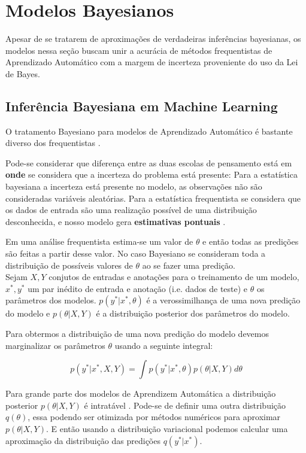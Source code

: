 \section{Modelos Bayesianos}

Apesar de se tratarem de aproximações de verdadeiras inferências bayesianas, os
modelos nessa seção buscam unir a acurácia de métodos frequentistas de
Aprendizado Automático com a
margem de incerteza proveniente do uso da Lei de Bayes.

\subsection{Inferência Bayesiana em Machine Learning}
\label{sec:bayesinf}
O tratamento Bayesiano para modelos de Aprendizado Automático é bastante diverso dos frequentistas \citep{dlbook}.

Pode-se considerar que diferença entre as duas escolas de pensamento está em
\textbf{onde} se considera que a incerteza do problema está presente: Para a
estatística bayesiana a incerteza está presente no modelo, as observações não
são consideradas variáveis aleatórias. Para a estatística frequentista
se considera que os dados de entrada são uma realização possível de uma
distribuição desconhecida, e nosso modelo gera \textbf{estimativas pontuais} \citep{rethink}.

Em uma análise frequentista estima-se um valor de $\theta$ e então todas as
predições são feitas a partir desse valor. No caso Bayesiano se consideram toda
a distribuição de possíveis valores de $\theta$ ao se fazer uma predição. \\ 


Sejam $X,Y$ conjutos de entradas e anotações para o treinamento de um modelo,
$x^*,y^*$ um par inédito de entrada e anotação (i.e. dados de teste) e
$\theta$ os parâmetros dos modelos. $p(y^* | x^*,\theta)$ é a verossimilhança de
uma nova predição do modelo e $p(\theta | X,Y)$ é a distribuição posterior dos
parâmetros do modelo.

Para obtermos a distribuição de uma nova
predição do modelo devemos marginalizar os parâmetros $\theta$ usando a seguinte integral:

\begin{equation}
  \label{eq:int}
  p(y^* | x^* , X,Y) = \int  p(y^* | x^*,\theta) p(\theta | X,Y)  d\theta 
\end{equation}

Para grande parte dos modelos de Aprendizem Automática a distribuição posterior
$p(\theta | X,Y)$ é intratável \citep{ubertime}. Pode-se de definir uma outra
distribuição $q(\theta)$, essa podendo ser otimizada por métodos numéricos para
aproximar $p(\theta | X,Y)$. E então usando a distribuição variacional podemos
calcular uma aproximação da distribuição das predições $q(y^*|x^*)$. 


